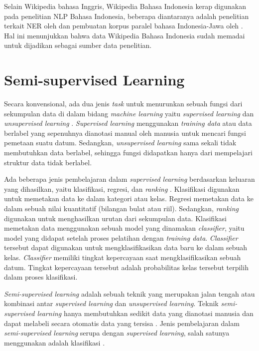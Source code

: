 Selain Wikipedia bahasa Inggris, Wikipedia Bahasa Indonesia kerap digunakan pada penelitian NLP Bahasa Indonesia, beberapa diantaranya adalah penelitian terkait NER oleh \cite{6973520} dan pembuatan korpus paralel bahasa Indonesia-Jawa oleh \cite{7065828}. Hal ini menunjukkan bahwa data Wikipedia Bahasa Indonesia sudah memadai untuk dijadikan sebagai sumber data penelitian.
	
\section{Semi-supervised Learning} \label{ssl-ssl}
Secara konvensional, ada dua jenis \textit{task} untuk menurunkan sebuah fungsi dari sekumpulan data di dalam bidang \textit{machine learning} yaitu \textit{supervised learning} dan \textit{unsupervised learning} \citep{chapelle2006semi}. \textit{Supervised learning} menggunakan \textit{training data} atau data berlabel yang sepenuhnya dianotasi manual oleh manusia untuk mencari fungsi pemetaan suatu datum. Sedangkan, \textit{unsupervised learning} sama sekali tidak membutuhkan data berlabel, sehingga fungsi didapatkan hanya dari mempelajari struktur data tidak berlabel.

Ada beberapa jenis pembelajaran dalam \textit{supervised learning} berdasarkan keluaran yang dihasilkan, yaitu klasifikasi, regresi, dan \textit{ranking} \citep{mohri2012foundations}. Klasifikasi digunakan untuk memetakan data ke dalam kategori atau kelas. Regresi memetakan data ke dalam sebuah nilai kuantitatif (bilangan bulat atau riil). Sedangkan, \textit{ranking} digunakan untuk menghasilkan urutan dari sekumpulan data. Klasifikasi memetakan data menggunakan sebuah model yang dinamakan \textit{classifier}, yaitu model yang didapat setelah proses pelatihan dengan \textit{training data}. \textit{Classifier} tersebut dapat digunakan untuk mengklasifikasikan data baru ke dalam sebuah kelas. \textit{Classifier} memiliki tingkat kepercayaan saat mengklasifikasikan sebuah datum. Tingkat kepercayaan tersebut adalah probabilitas kelas tersebut terpilih dalam proses klasifikasi. 

\textit{Semi-supervised learning} adalah sebuah teknik yang merupakan jalan tengah atau kombinasi antar \textit{supervised learning} dan \textit{unsupervised learning}. Teknik \textit{semi-supervised learning} hanya membutuhkan sedikit data yang dianotasi manusia dan dapat melabeli secara otomatis data yang tersisa \citep{chapelle2006semi}. Jenis pembelajaran dalam \textit{semi-supervised learning} serupa dengan \textit{supervised learning}, salah satunya menggunakan adalah klasifikasi \citep{mohri2012foundations}. 

